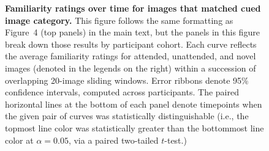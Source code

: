 \documentclass{article}
\def\rot#1{\raisebox{-1.35in}{\rotatebox{90}{#1}}}
\begin{document}


\begin{figure}[ht]
\captionsetup[subfigure]{labelformat=empty}
\rot{\rlap{\textbf{Sustained}}}
 \hfill
 \hfill



\raisebox{.05in}{\rot{\rlap{\textbf{Variable}}}}
 \hfill
 \hfill

  \caption{\textbf{Familiarity ratings over time for images that matched cued image category.}  This figure follows the same formatting as
  Figure~4 (top panels) in the main text, but the panels in this figure break down
  those results by participant cohort.  Each curve reflects the average familiarity ratings for attended, unattended, and novel images (denoted in the legends on the right) within a succession of overlapping 20-image sliding windows.  Error ribbons denote 95\% confidence intervals, computed across participants. The paired horizontal lines at the bottom of each panel denote timepoints when the given pair of curves was statistically distinguishable (i.e., the topmost line color was statistically greater than the bottommost line color at $\alpha = 0.05$, via a paired two-tailed $t$-test.)}
  \label{fig:familiarity_timecourse_category3}
\end{figure}
\end{document}
